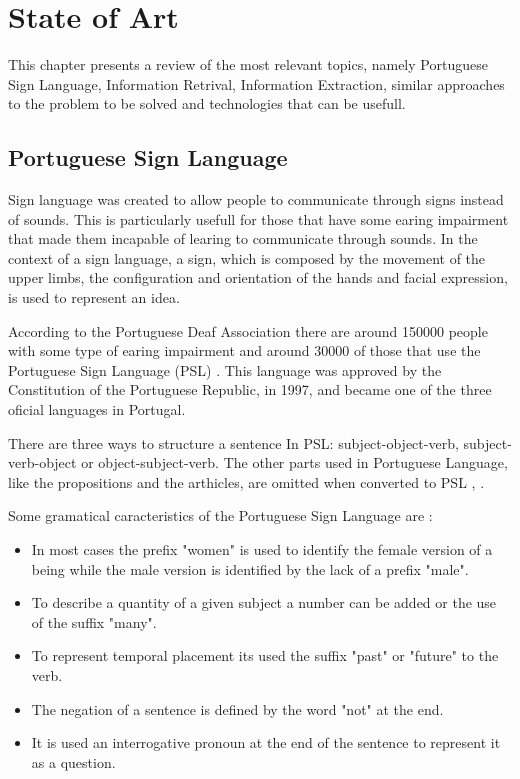 
\chapter{State of Art}
\label{chap:Chapter2}

This chapter presents a review of the most relevant topics, namely Portuguese Sign Language, Information Retrival, Information Extraction, similar approaches to the problem to be solved and technologies that can be usefull.

\section{Portuguese Sign Language}

Sign language was created to allow people to communicate through signs instead of sounds.
This is particularly usefull for those that have some earing impairment that made them incapable of learing to communicate through sounds.
In the context of a sign language, a sign, which is composed by the movement of the upper limbs, the configuration and orientation of the hands and facial expression, is used to represent an idea.
    
According to the Portuguese Deaf Association there are around 150000 people with some type of earing impairment and around 30000 of those that use the Portuguese Sign Language (PSL) \autocite{gaspar_2015}.
This language was approved by the Constitution of the Portuguese Republic, in 1997, and became one of the three oficial languages in Portugal.

There are three ways to structure a sentence In PSL: subject-object-verb, subject-verb-object or object-subject-verb.
The other parts used in Portuguese Language, like the propositions and the arthicles, are omitted when converted to PSL \autocite{bento_2013}, \autocite{martins_2011}.

Some gramatical caracteristics of the Portuguese Sign Language are \autocite{bento_2013}:

\begin{itemize}
    \item In most cases the prefix "women" is used to identify the female version of a being while the male version is identified by the lack of a prefix "male".
    \item To describe a quantity of a given subject a number can be added or the use of the suffix "many".
    \item To represent temporal placement its used the suffix "past" or "future" to the verb.
    \item The negation of a sentence is defined by the word "not" at the end.
    \item It is used an interrogative pronoun at the end of the sentence to represent it as a question.
\end{itemize}

